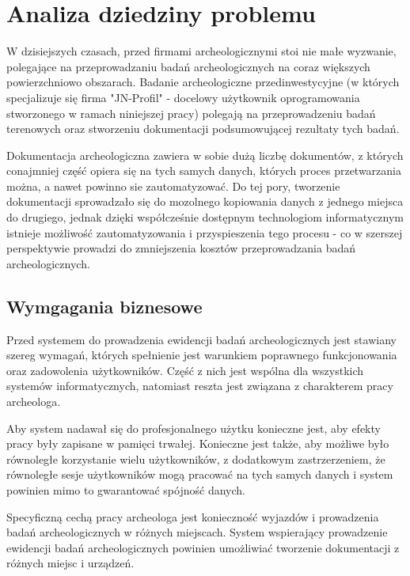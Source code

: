 \chapter{Analiza dziedziny problemu}
W dzisiejszych czasach, przed firmami archeologicznymi stoi nie małe wyzwanie, polegające na przeprowadzaniu badań archeologicznych na coraz większych powierzchniowo obszarach. Badanie archeologiczne przedinwestycyjne (w których specjalizuje się firma "JN-Profil" - docelowy użytkownik oprogramowania stworzonego w ramach niniejszej pracy) polegają na przeprowadzeniu badań terenowych oraz stworzeniu dokumentacji podsumowującej rezultaty tych badań.

Dokumentacja archeologiczna zawiera w sobie dużą liczbę dokumentów, z których conajmniej część opiera się na tych samych danych, których proces przetwarzania można, a nawet powinno sie zautomatyzować. Do tej pory, tworzenie dokumentacji sprowadzało się do mozolnego kopiowania danych z jednego miejsca do drugiego, jednak dzięki współcześnie dostępnym technologiom informatycznym istnieje możliwość zautomatyzowania i przyspieszenia tego procesu - co w szerszej perspektywie prowadzi do zmniejszenia kosztów przeprowadzania badań archeologicznych.

\section{Wymgagania biznesowe}
Przed systemem do prowadzenia ewidencji badań archeologicznych jest stawiany szereg wymagań, których spełnienie jest warunkiem poprawnego funkcjonowania oraz zadowolenia użytkowników. Część z nich jest wspólna dla wszystkich systemów informatycznych, natomiast reszta jest związana z charakterem pracy archeologa.

Aby system nadawał się do profesjonalnego użytku konieczne jest, aby efekty pracy były zapisane w pamięci trwałej. Konieczne jest także, aby możliwe było równoległe korzystanie wielu użytkowników, z dodatkowym zastrzerzeniem, że równoległe sesje użytkowników mogą pracować na tych samych danych i system powinien mimo to gwarantować spójność danych.

Specyficzną cechą pracy archeologa jest konieczność wyjazdów i prowadzenia badań archeologicznych w różnych miejscach. System wspierający prowadzenie ewidencji badań archeologicznych powinien umożliwiać tworzenie dokumentacji z różnych miejsc i urządzeń. 
\newpage
